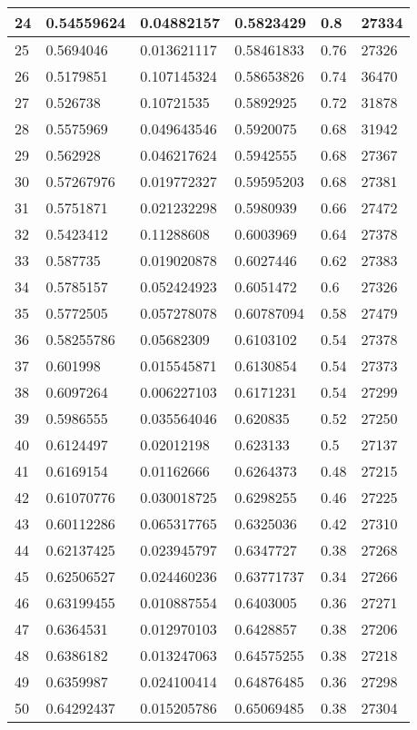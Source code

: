 \begin{longtable}{|l|l|l|l|l|l|}
24 & 0.54559624 & 0.04882157 & 0.5823429 & 0.8 & 27334 \\ \hline 
25 & 0.5694046 & 0.013621117 & 0.58461833 & 0.76 & 27326 \\ \hline 
26 & 0.5179851 & 0.107145324 & 0.58653826 & 0.74 & 36470 \\ \hline 
27 & 0.526738 & 0.10721535 & 0.5892925 & 0.72 & 31878 \\ \hline 
28 & 0.5575969 & 0.049643546 & 0.5920075 & 0.68 & 31942 \\ \hline 
29 & 0.562928 & 0.046217624 & 0.5942555 & 0.68 & 27367 \\ \hline 
30 & 0.57267976 & 0.019772327 & 0.59595203 & 0.68 & 27381 \\ \hline 
31 & 0.5751871 & 0.021232298 & 0.5980939 & 0.66 & 27472 \\ \hline 
32 & 0.5423412 & 0.11288608 & 0.6003969 & 0.64 & 27378 \\ \hline 
33 & 0.587735 & 0.019020878 & 0.6027446 & 0.62 & 27383 \\ \hline 
34 & 0.5785157 & 0.052424923 & 0.6051472 & 0.6 & 27326 \\ \hline 
35 & 0.5772505 & 0.057278078 & 0.60787094 & 0.58 & 27479 \\ \hline 
36 & 0.58255786 & 0.05682309 & 0.6103102 & 0.54 & 27378 \\ \hline 
37 & 0.601998 & 0.015545871 & 0.6130854 & 0.54 & 27373 \\ \hline 
38 & 0.6097264 & 0.006227103 & 0.6171231 & 0.54 & 27299 \\ \hline 
39 & 0.5986555 & 0.035564046 & 0.620835 & 0.52 & 27250 \\ \hline 
40 & 0.6124497 & 0.02012198 & 0.623133 & 0.5 & 27137 \\ \hline 
41 & 0.6169154 & 0.01162666 & 0.6264373 & 0.48 & 27215 \\ \hline 
42 & 0.61070776 & 0.030018725 & 0.6298255 & 0.46 & 27225 \\ \hline 
43 & 0.60112286 & 0.065317765 & 0.6325036 & 0.42 & 27310 \\ \hline 
44 & 0.62137425 & 0.023945797 & 0.6347727 & 0.38 & 27268 \\ \hline 
45 & 0.62506527 & 0.024460236 & 0.63771737 & 0.34 & 27266 \\ \hline 
46 & 0.63199455 & 0.010887554 & 0.6403005 & 0.36 & 27271 \\ \hline 
47 & 0.6364531 & 0.012970103 & 0.6428857 & 0.38 & 27206 \\ \hline 
48 & 0.6386182 & 0.013247063 & 0.64575255 & 0.38 & 27218 \\ \hline 
49 & 0.6359987 & 0.024100414 & 0.64876485 & 0.36 & 27298 \\ \hline 
50 & 0.64292437 & 0.015205786 & 0.65069485 & 0.38 & 27304 \\ \hline 
\end{longtable}